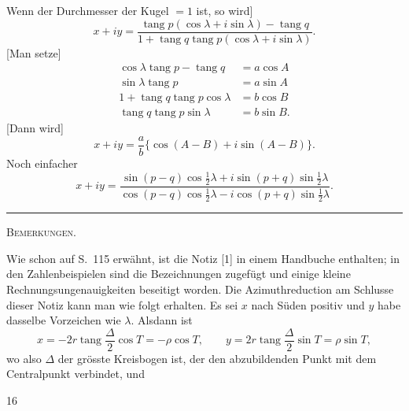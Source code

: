 Wenn der Durchmesser der Kugel $=1$ ist, so wird]
\[
x+iy=\frac{\operatorname{tang}p(\cos\lambda+i\sin\lambda)-\operatorname{tang}q}{1+\operatorname{tang}q\operatorname{tang}p(\cos\lambda+i\sin\lambda)}.
\]
[Man setze]
\[
\begin{aligned}
\cos\lambda\operatorname{tang}p-\operatorname{tang}q&=a\cos A\\
\sin\lambda\operatorname{tang}p&=a\sin A\\
1+\operatorname{tang}q\operatorname{tang}p\cos\lambda&=b\cos B\\
\operatorname{tang}q\operatorname{tang}p\sin\lambda&=b\sin B.
\end{aligned}
\]
[Dann wird]
\[
x+iy=\frac ab\{\cos(A-B)+i\sin(A-B)\}.
\]
Noch einfacher
\[
x+iy=\frac{\sin(p-q)\cos\frac12\lambda+i\sin(p+q)\sin\frac12\lambda}{\cos(p-q)\cos\frac12\lambda-i\cos(p+q)\sin\frac12\lambda}.
\]
\begin{center}\rule{.18\textwidth}{.4pt}\par\vspace{10mm}\textsc{Bemerkungen.}\end{center}
\begingroup\small
Wie schon auf S.~115 erwähnt, ist die Notiz [1] in einem Handbuche enthalten; in den Zahlenbeispielen sind die Bezeichnungen zugefügt und einige kleine Rechnungsungenauigkeiten beseitigt worden. Die Azimuthreduction am Schlusse dieser Notiz kann man wie folgt erhalten. Es sei $x$ nach Süden positiv und $y$ habe dasselbe Vorzeichen wie $\lambda$. Alsdann ist
\[
x=-2r\operatorname{tang}\frac\Delta2\cos T=-\rho\cos T,\qquad y=2r\operatorname{tang}\frac\Delta2\sin T=\rho\sin T,
\]
wo also $\Delta$ der grösste Kreisbogen ist, der den abzubildenden Punkt mit dem Centralpunkt verbindet, und
\par\endgroup
\vfill{}\hfill16\hspace*{2cm}\par
\endgroup
